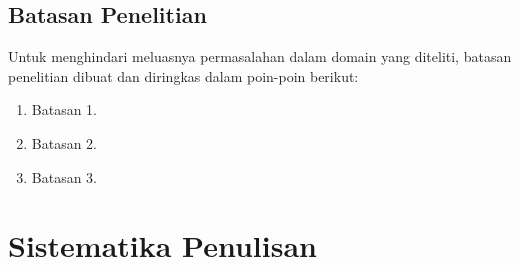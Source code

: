 \subsection{Batasan Penelitian}
\label{sec:3-BatasanPenelitian}
Untuk menghindari meluasnya permasalahan dalam domain yang diteliti, batasan penelitian dibuat dan diringkas dalam poin-poin berikut:
\begin{enumerate}
    \item Batasan 1.
    \item Batasan 2. 
    \item Batasan 3.
\end{enumerate}

\section{Sistematika Penulisan}
